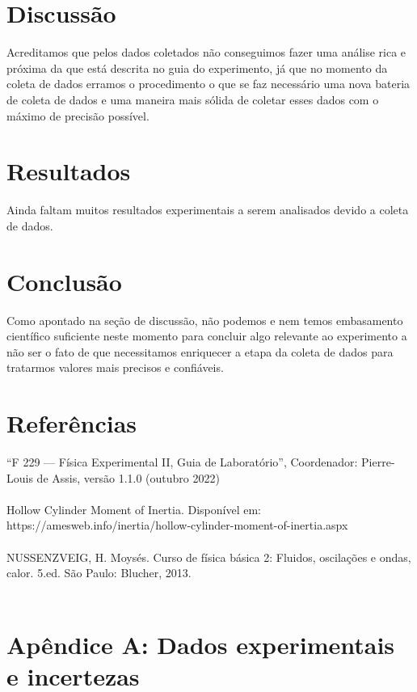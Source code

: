 \documentclass[a4paper]{report}
\begin{document}
\section*{Discussão}
\qquad Acreditamos que pelos dados coletados não conseguimos fazer uma análise rica e próxima da que está descrita no guia do experimento, já que no momento da coleta de dados erramos o procedimento o que se faz necessário uma nova bateria de coleta de dados e uma maneira mais sólida de coletar esses dados com o máximo de precisão possível.
\section*{Resultados}
\qquad Ainda faltam muitos resultados experimentais a serem analisados devido a coleta de dados.
\section*{Conclusão}
\qquad Como apontado na seção de discussão, não podemos e nem temos embasamento científico suficiente neste momento para concluir algo relevante ao experimento a não ser o fato de que necessitamos enriquecer a etapa da coleta de dados para tratarmos valores mais precisos e confiáveis.
\section*{Referências}
“F 229 — Física Experimental II, Guia de Laboratório”, Coordenador: Pierre-Louis de Assis, versão 1.1.0 (outubro 2022) \\ \ \\ 
\qquad Hollow Cylinder Moment of Inertia. Disponível em: https://amesweb.info/inertia/hollow-cylinder-moment-of-inertia.aspx\\ \ \\ 
NUSSENZVEIG, H. Moysés. Curso de física básica 2: Fluidos, oscilações e ondas, calor. 5.ed. São Paulo: Blucher, 2013.\\ \ \\

\section*{Apêndice A: Dados experimentais e incertezas}
\end{document}
